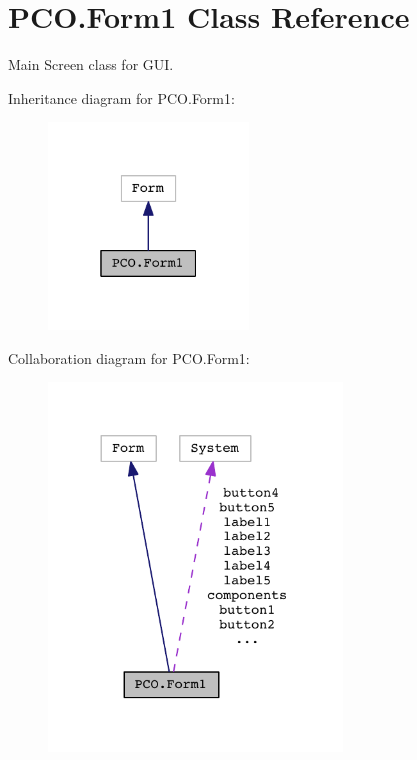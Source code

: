 \hypertarget{classPCO_1_1Form1}{}\section{P\+C\+O.\+Form1 Class Reference}
\label{classPCO_1_1Form1}


Main Screen class for G\+UI.  




Inheritance diagram for P\+C\+O.\+Form1\+:\nopagebreak
\begin{figure}[H]
\begin{center}
\leavevmode
\includegraphics[width=151pt]{classPCO_1_1Form1__inherit__graph}
\end{center}
\end{figure}


Collaboration diagram for P\+C\+O.\+Form1\+:\nopagebreak
\begin{figure}[H]
\begin{center}
\leavevmode
\includegraphics[width=221pt]{classPCO_1_1Form1__coll__graph}
\end{center}
\end{figure}
